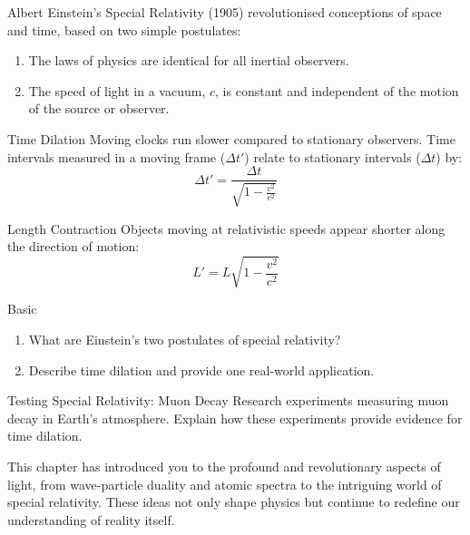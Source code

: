 Albert Einstein's Special Relativity (1905) revolutionised conceptions of space and time, based on two simple postulates:

\begin{enumerate}
\item The laws of physics are identical for all inertial observers.
\item The speed of light in a vacuum, $c$, is constant and independent of the motion of the source or observer.
\end{enumerate}

\begin{keyconcept}{Time Dilation}
Moving clocks run slower compared to stationary observers. Time intervals measured in a moving frame ($\Delta t'$) relate to stationary intervals ($\Delta t$) by:
\[
\Delta t'=\frac{\Delta t}{\sqrt{1-\frac{v^2}{c^2}}}
\]
\end{keyconcept}

\begin{keyconcept}{Length Contraction}
Objects moving at relativistic speeds appear shorter along the direction of motion:
\[
L'=L\sqrt{1-\frac{v^2}{c^2}}
\]
\end{keyconcept}

\begin{tieredquestions}{Basic}
\begin{enumerate}
\item What are Einstein's two postulates of special relativity?
\item Describe time dilation and provide one real-world application.
\end{enumerate}
\end{tieredquestions}

\begin{investigation}{Testing Special Relativity: Muon Decay}
Research experiments measuring muon decay in Earth's atmosphere. Explain how these experiments provide evidence for time dilation.
\end{investigation}


\FloatBarrier

This chapter has introduced you to the profound and revolutionary aspects of light, from wave-particle duality and atomic spectra to the intriguing world of special relativity. These ideas not only shape physics but continue to redefine our understanding of reality itself.